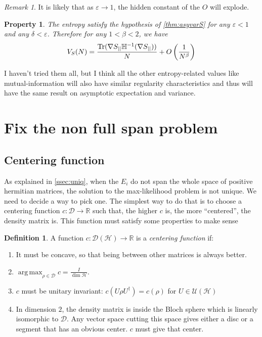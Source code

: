 \documentclass[10pt,a4paper]{report}
\theoremstyle{plain}
\newtheorem{prop}[thm]{Property}
\theoremstyle{definition}
\newtheorem{defn}{Definition}[chapter]
\theoremstyle{remark}
\newtheorem*{rem}{Remark}
\newcommand{\R}{\ensuremath{\mathbb{R}}}
\DeclareMathOperator{\Tr}{Tr}
\DeclareMathOperator{\argmax}{arg\,max}
\begin{document}
\begin{rem}
It is likely that as $\varepsilon \to 1$, the hidden constant
of the $O$ will explode.
\end{rem}

\begin{prop}
  The entropy satisfy the hypothesis of \cref{thm:asyvarS} for any $\varepsilon
  < 1$ and any $\delta < \varepsilon$. Therefore for any $1 < \beta < 2$, we have
  \[V_S(N) = \frac{\Tr(\nabla S\pr \mathbb H\inv(\nabla S\pr))}N
    +O\left(\frac 1 {N^\beta}\right)\]
\end{prop}



I haven't tried them all, but I think all the other entropy-related values like
mutual-information will also have similar regularity characteristics and thus will
have the same result on asymptotic expectation and variance.



\section{Fix the non full span problem}\label{sec:fixspan}

\subsection{Centering function}

As explained in \cref{ssec:uniq}, when the $E_i$ do not span the whole space of
positive hermitian matrices, the solution to the max-likelihood problem is not
unique. We need to decide a way to pick one. The simplest way to do that is to
choose a centering function $c : \mathcal{D} \to \R$ such that, the higher $c$
is, the more ``centered'', the density matrix is. This function must satisfy
some properties to make sense

\begin{defn}
  A function $c : \mathcal{D}(\mathcal{H}) \to \R$ is a \emph{centering function} if:

  \begin{enumerate}
  \item It must be concave, so that being between other matrices is always better.
  \item $\displaystyle \argmax_{\rho \in \mathcal{D}} c = \frac I{\dim
      \mathcal{H}}$.
  \item $c$ must be unitary invariant: $c(U\rho U^\dagger) = c(\rho)$ for $U \in \mathcal{U}(\mathcal{H})$
  \item In dimension $2$, the density matrix is inside the Bloch sphere which is
    linearly isomorphic to $\mathcal{D}$. Any vector space cutting this space
    gives either a disc or a segment that has an obvious center. $c$ must give
    that center.
  \end{enumerate}
\end{defn}
\end{document}
